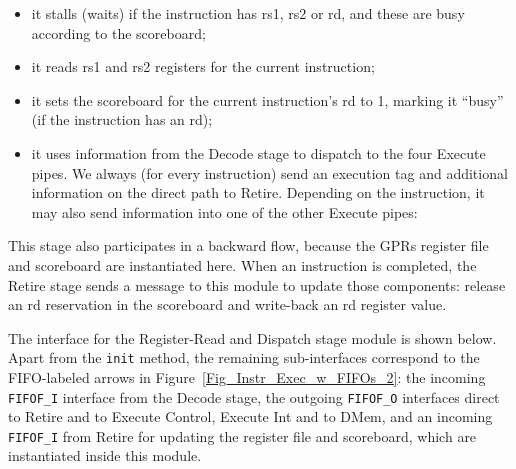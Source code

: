 \begin{itemize}

  \item it stalls (waits) if the instruction has rs1, rs2 or rd, and
        these are busy according to the scoreboard;

  \item it reads rs1 and rs2 registers for the current instruction;

  \item it sets the scoreboard for the current instruction's rd to 1,
        marking it ``busy'' (if the instruction has an rd);

  \item it uses information from the Decode stage to dispatch to the
        four Execute pipes.  We always (for every instruction) send an
        execution tag and additional information on the direct path to
        Retire.  Depending on the instruction, it may also send
        information into one of the other Execute pipes:


\end{itemize}

This stage also participates in a backward flow, because the GPRs
register file and scoreboard are instantiated here.  When an
instruction is completed, the Retire stage sends a message to this
module to update those components: release an rd reservation in the
scoreboard and write-back an rd register value.

The interface for the Register-Read and Dispatch stage module is shown
below.  Apart from the \verb|init| method, the remaining
sub-interfaces correspond to the FIFO-labeled arrows in
Figure~\ref{Fig_Instr_Exec_w_FIFOs_2}: the incoming \verb|FIFOF_I|
interface from the Decode stage, the outgoing \verb|FIFOF_O|
interfaces direct to Retire and to Execute Control, Execute Int and to
DMem, and an incoming \verb|FIFOF_I| from Retire for updating the
register file and scoreboard, which are instantiated inside this
module.




